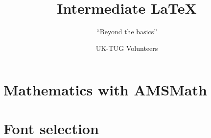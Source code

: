 \usepackage[T1]{fontenc}
\usepackage{babel,booktabs,csquotes,lmodern,tikz,verbatim}

\newcommand*{\cls}[1]{\textsf{#1}}
\newcommand*{\cs}[1]{\texttt{\char`\\#1}}
\newcommand*{\marg}[1]{\texttt{\char`\{#1\char`\}}}
\newcommand*{\meta}[1]{\ensuremath{\langle}\emph{#1}\ensuremath{\rangle}}
\newcommand*{\oarg}[1]{\texttt{[#1]}}
\newcommand*{\pkg}[1]{\textsf{#1}}

\renewcommand*{\LaTeX}{LaTeX}
\renewcommand*{\LaTeXe}{LaTeX2e}
\renewcommand*{\TeX}{TeX}

\newcommand*{\BibTeX}{BibTeX}
\newcommand*{\LuaTeX}{LuaTeX}
\newcommand*{\pdfTeX}{pdfTeX}
\newcommand*{\XeTeX}{XeTeX}

\title{Intermediate \LaTeX{}}
\subtitle{\enquote{Beyond the basics}}
\author{UK-TUG Volunteers}
\date{}



\begin{frame}
  \titlepage
\end{frame}



\section{Mathematics with AMSMath}

\section{Font selection}


